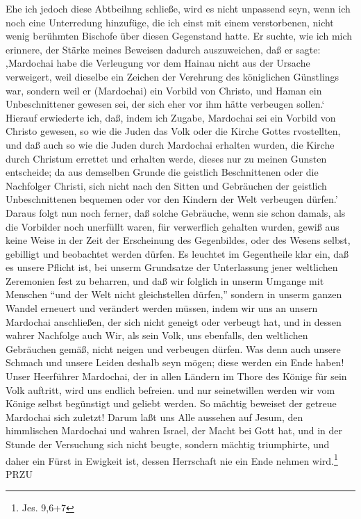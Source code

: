 Ehe ich jedoch diese Abtbeilnng schließe, wird es nicht unpassend seyn, wenn ich
noch eine Unterredung hinzufüge, die ich einst mit einem verstorbenen, nicht
wenig berühmten Bischofe über diesen Gegenstand hatte. Er suchte, wie ich mich
erinnere, der Stärke meines Beweisen dadurch auszuweichen, daß er sagte:
‚Mardochai habe die Verleugung vor dem Hainau nicht aus der Ursache verweigert,
weil dieselbe ein Zeichen der Verehrung des königlichen Günstlings war, sondern
weil er (Mardochai) ein Vorbild von Christo, und Haman ein Unbeschnittener
gewesen sei, der sich eher vor ihm hätte verbeugen sollen.‘ Hierauf erwiederte
ich, daß, indem ich Zugabe, Mardochai sei ein Vorbild von Christo gewesen, so
wie die Juden das Volk oder die Kirche Gottes rvostellten, und daß auch so wie
die Juden durch Mardochai erhalten wurden, die Kirche durch Christum errettet
und erhalten werde, dieses nur zu meinen Gunsten entscheide; da aus demselben
Grunde die geistlich Beschnittenen oder die Nachfolger Christi, sich nicht nach
den Sitten und Gebräuchen der geistlich Unbeschnittenen bequemen oder vor den
Kindern der Welt verbeugen dürfen.' Daraus folgt nun noch ferner, daß solche
Gebräuche, wenn sie schon damals, als die Vorbilder noch unerfüllt waren, für
verwerflich gehalten wurden, gewiß aus keine Weise in der Zeit der Erscheinung
des Gegenbildes, oder des Wesens selbst, gebilligt und beobachtet werden dürfen.
Es leuchtet im Gegentheile klar ein, daß es unsere Pflicht ist, bei unserm
Grundsatze der Unterlassung jener weltlichen Zeremonien fest zu beharren, und
daß wir folglich in unserm Umgange mit Menschen "`und der Welt nicht
gleichstellen dürfen,"' sondern in unserm ganzen Wandel erneuert und verändert
werden müssen, indem wir uns an unsern Mardochai anschließen, der sich nicht
geneigt oder verbeugt hat, und in dessen wahrer Nachfolge auch Wir, als sein
Volk, uns ebenfalls, den weltlichen Gebräuchen gemäß, nicht neigen und verbeugen
dürfen. Was denn auch unsere Schmach und unsere Leiden deshalb seyn mögen; diese
werden ein Ende haben! Unser Heerführer Mardochai, der in allen Ländern im Thore
des Könige für sein Volk auftritt, wird uns endlich befreien. und nur
seinetwillen werden wir vom Könige selbst begünstigt und geliebt werden. So
mächtig beweiset der getreue Mardochai sich zuletzt! Darum laßt uns Alle
aussehen auf Jesum, den himmlischen Mardochai und wahren Israel, der Macht bei
Gott hat, und in der Stunde der Versuchung sich nicht beugte, sondern mächtig
triumphirte, und daher ein Fürst in Ewigkeit ist, dessen Herrschaft nie ein Ende
nehmen wird.\footnote{Jes. 9,6+7} {{PRZU}}


